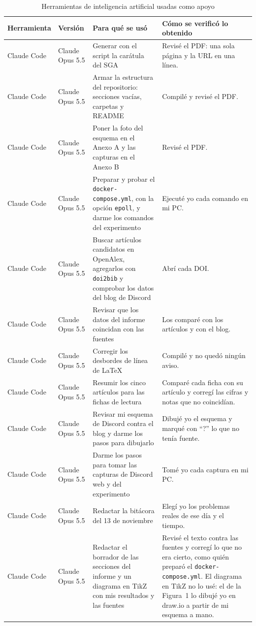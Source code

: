 \documentclass[11pt,a4paper]{article}
\begin{document}
\begin{table}[H]
  \centering
  \caption{Herramientas de inteligencia artificial usadas como apoyo}
  \label{tab:declaracion-ia}
  \begin{tabularx}{\textwidth}{@{}llXX@{}}
    \toprule
    \textbf{Herramienta} & \textbf{Versión} & \textbf{Para qué se usó} & \textbf{Cómo se verificó lo obtenido} \\
    \midrule
    Claude Code & Claude Opus 5.5 & Generar con el script la carátula del SGA & Revisé el PDF: una sola página y la URL en una línea. \\
    Claude Code & Claude Opus 5.5 & Armar la estructura del repositorio: secciones vacías, carpetas y README & Compilé y revisé el PDF. \\
    Claude Code & Claude Opus 5.5 & Poner la foto del esquema en el Anexo A y las capturas en el Anexo B & Revisé el PDF. \\
    Claude Code & Claude Opus 5.5 & Preparar y probar el \texttt{docker-compose.yml}, con la opción \texttt{epoll}, y darme los comandos del experimento & Ejecuté yo cada comando en mi PC. \\
    Claude Code & Claude Opus 5.5 & Buscar artículos candidatos en OpenAlex, agregarlos con \texttt{doi2bib} y comprobar los datos del blog de Discord & Abrí cada DOI. \\
    Claude Code & Claude Opus 5.5 & Revisar que los datos del informe coincidan con las fuentes & Los comparé con los artículos y con el blog. \\
    Claude Code & Claude Opus 5.5 & Corregir los desbordes de línea de LaTeX & Compilé y no quedó ningún aviso. \\
    Claude Code & Claude Opus 5.5 & Resumir los cinco artículos para las fichas de lectura & Comparé cada ficha con su artículo y corregí las cifras y notas que no coincidían. \\
    Claude Code & Claude Opus 5.5 & Revisar mi esquema de Discord contra el blog y darme los pasos para dibujarlo & Dibujé yo el esquema y marqué con \enquote{?} lo que no tenía fuente. \\
    Claude Code & Claude Opus 5.5 & Darme los pasos para tomar las capturas de Discord web y del experimento & Tomé yo cada captura en mi PC. \\
    Claude Code & Claude Opus 5.5 & Redactar la bitácora del 13 de noviembre & Elegí yo los problemas reales de ese día y el tiempo. \\
    Claude Code & Claude Opus 5.5 & Redactar el borrador de las secciones del informe y un diagrama en TikZ con mis resultados y las fuentes & Revisé el texto contra las fuentes y corregí lo que no era cierto, como quién preparó el \texttt{docker-compose.yml}. El diagrama en TikZ no lo usé: el de la Figura~1 lo dibujé yo en draw.io a partir de mi esquema a mano. \\
    \bottomrule
  \end{tabularx}
\end{table}
\end{document}
